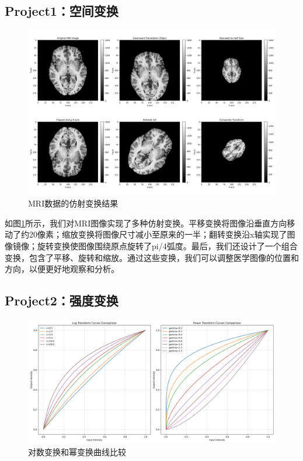 \documentclass[10.5pt]{config}
\begin{document}
\subsection{Project1：空间变换}
\begin{figure}[htbp]
    \centering
    \includegraphics[width=1.0\linewidth]{figures/MRI_affine_transformations.png}
    \caption{MRI数据的仿射变换结果}
    \label{fig:mri_affine}
\end{figure}

如图\ref{fig:mri_affine}所示，我们对MRI图像实现了多种仿射变换。平移变换将图像沿垂直方向移动了约20像素；缩放变换将图像尺寸减小至原来的一半；翻转变换沿x轴实现了图像镜像；旋转变换使图像围绕原点旋转了pi/4弧度。最后，我们还设计了一个组合变换，包含了平移、旋转和缩放。通过这些变换，我们可以调整医学图像的位置和方向，以便更好地观察和分析。

\subsection{Project2：强度变换}
\begin{figure}[htbp]
    \centering
    \includegraphics[width=1.0\linewidth]{figures/CT_transform_curves.png}
    \caption{对数变换和幂变换曲线比较}
    \label{fig:transform_curves}
\end{figure}
\end{document}
